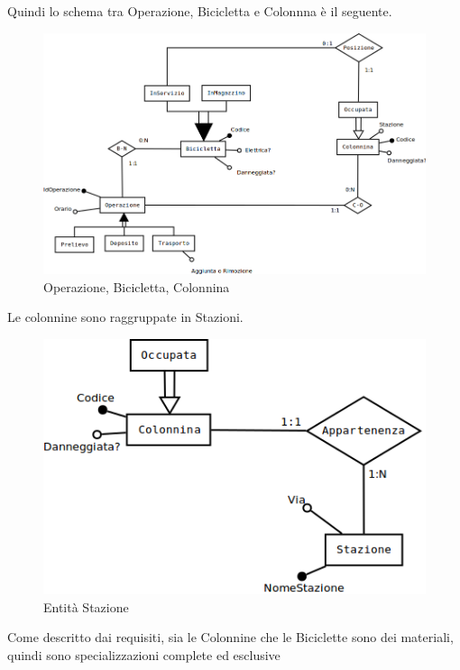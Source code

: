 \documentclass[a4paper,twoside]{article}
\begin{document}
Quindi lo schema tra Operazione, Bicicletta e Colonnna è il seguente.
\begin{figure}[H]
 \centering
  \includegraphics[width=1\textwidth]{Immagini-Grafici/Concettuale10.png}
\caption{Operazione, Bicicletta, Colonnina}
\end{figure}
Le colonnine sono raggruppate in Stazioni.
\begin{figure}[H]
 \centering
  \includegraphics[width=1\textwidth]{Immagini-Grafici/Concettuale11.png}
\caption{Entità Stazione}
\end{figure}
Come descritto dai requisiti, sia le Colonnine che le Biciclette sono dei materiali, quindi sono specializzazioni complete ed esclusive
\end{document}
